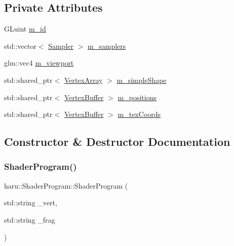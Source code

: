 \subsection*{Private Attributes}
\begin{DoxyCompactItemize}
\item 
G\+Luint \mbox{\hyperlink{classharu_1_1_shader_program_a9aefbe81aaa09ee5d881c708d14c4175}{m\+\_\+id}}
\item 
std\+::vector$<$ \mbox{\hyperlink{structharu_1_1_sampler}{Sampler}} $>$ \mbox{\hyperlink{classharu_1_1_shader_program_acb7b3e2ef877a1022fccf4951567d1bf}{m\+\_\+samplers}}
\item 
glm\+::vec4 \mbox{\hyperlink{classharu_1_1_shader_program_a2eb3daf1a2dc547187d934a5db92ab6a}{m\+\_\+viewport}}
\item 
std\+::shared\+\_\+ptr$<$ \mbox{\hyperlink{classharu_1_1_vertex_array}{Vertex\+Array}} $>$ \mbox{\hyperlink{classharu_1_1_shader_program_a294aa6017a95424af663d11de22c8a30}{m\+\_\+simple\+Shape}}
\item 
std\+::shared\+\_\+ptr$<$ \mbox{\hyperlink{classharu_1_1_vertex_buffer}{Vertex\+Buffer}} $>$ \mbox{\hyperlink{classharu_1_1_shader_program_a2c35054cf33234db86676f9c94bef3a6}{m\+\_\+positions}}
\item 
std\+::shared\+\_\+ptr$<$ \mbox{\hyperlink{classharu_1_1_vertex_buffer}{Vertex\+Buffer}} $>$ \mbox{\hyperlink{classharu_1_1_shader_program_acbf6bb784e05081a29ef90a04ae2269d}{m\+\_\+tex\+Coords}}
\end{DoxyCompactItemize}


\subsection{Constructor \& Destructor Documentation}
\mbox{\label{classharu_1_1_shader_program_acfb9528364468c5cbabb1f581643ae25}} 
\subsubsection{\texorpdfstring{Shader\+Program()}{ShaderProgram()}}
{\footnotesize\ttfamily haru\+::\+Shader\+Program\+::\+Shader\+Program (\begin{DoxyParamCaption}\item[{std\+::string}]{\+\_\+vert,  }\item[{std\+::string}]{\+\_\+frag }\end{DoxyParamCaption})}



